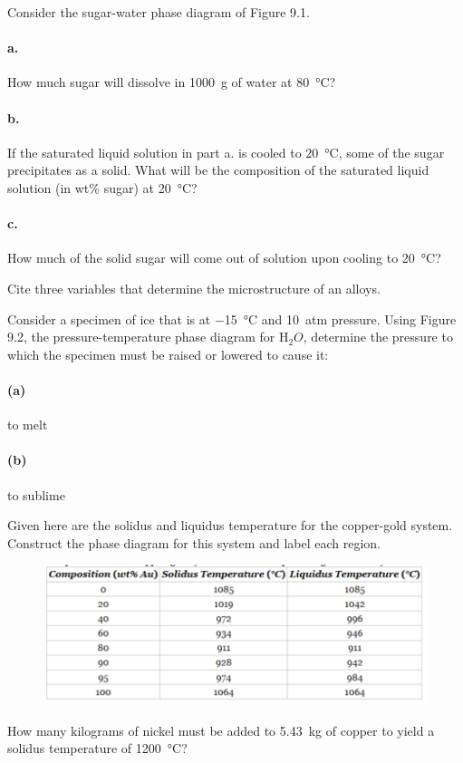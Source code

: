 
 Consider the sugar-water phase diagram of Figure 9.1.

\paragraph{a.} How much sugar will dissolve in \qty{1000}{g} of water at \qty{80}{\celsius}?

\paragraph{b.} If the saturated liquid solution in part a. is cooled to \qty{20}{\celsius}, some of the sugar precipitates as a solid. What will be the composition of the saturated liquid solution (in wt\% sugar) at \qty{20}{\celsius}?

\paragraph{c.} How much of the solid sugar will come out of solution upon cooling to \qty{20}{\celsius}?

 Cite three variables that determine the microstructure of an alloys.

 Consider a specimen of ice that is at \qty{-15}{\celsius} and \qty{10}{atm} pressure. Using Figure 9.2, the pressure-temperature phase diagram for $\mathrm{H}\mathrm{_2}O$, determine the pressure to which the specimen must be raised or lowered to cause it:

\paragraph{(a)} to melt

\paragraph{(b)} to sublime


 Given here are the solidus and liquidus temperature for the copper-gold system. Construct the phase diagram for this system and label each region.
\begin{figure} [ht]
  \centering
  \includegraphics[width=0.5\linewidth]{./figures/f14_1.png}
  \caption{}
  \label{fig:e14_1}
\end{figure}

 How many kilograms of nickel must be added to \qty{5,43}{kg} of copper to yield a solidus temperature of \qty{1200}{\celsius}?
